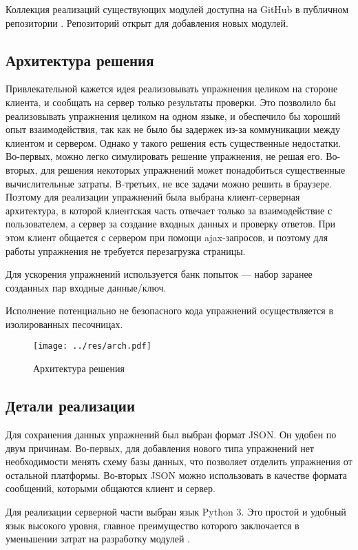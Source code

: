 \documentclass{matmex-diploma-custom}
\begin{document}
Коллекция реализаций существующих модулей доступна на GitHub в
публичном репозитории \cite{plugins:repo}. Репозиторий открыт для
добавления новых модулей.

\subsection{Архитектура решения}
Привлекательной кажется идея реализовывать упражнения целиком на
стороне клиента, и сообщать на сервер только результаты проверки. Это
позволило бы реализовывать упражнения целиком на одном языке, и
обеспечило бы хороший опыт взаимодействия, так как не было бы задержек
из-за коммуникации между клиентом и сервером. Однако у такого решения
есть существенные недостатки. Во-первых, можно легко симулировать
решение упражнения, не решая его. Во-вторых, для решения некоторых
упражнений может понадобиться существенные вычислительные
затраты. В-третьих, не все задачи можно решить в браузере. Поэтому для
реализации упражнений была выбрана клиент-серверная архитектура, в
которой клиентская часть отвечает только за взаимодействие с
пользователем, а сервер за создание входных данных и проверку
ответов. При этом клиент общается с сервером при помощи ajax-запросов,
и поэтому для работы упражнения не требуется перезагрузка страницы.

Для ускорения упражнений используется банк попыток --- набор
заранее созданных пар входные данные/ключ.

Исполнение потенциально не безопасного кода упражнений осуществляется
в изолированных песочницах.

\begin{figure}[h]
  \centering
  \texttt{[image: ../res/arch.pdf]}
  \caption{Архитектура решения}
\end{figure}

\subsection{Детали реализации}
Для сохранения данных упражнений был выбран формат JSON. Он удобен по
двум причинам. Во-первых, для добавления нового типа упражнений нет
необходимости менять схему базы данных, что позволяет отделить
упражнения от остальной платформы. Во-вторых JSON можно использовать в
качестве формата сообщений, которыми общаются клиент и сервер.

Для реализации серверной части выбран язык Python 3. Это простой и
удобный язык высокого уровня, главное преимущество которого
заключается в уменьшении затрат на разработку модулей  \cite{pyprod}.
\end{document}
